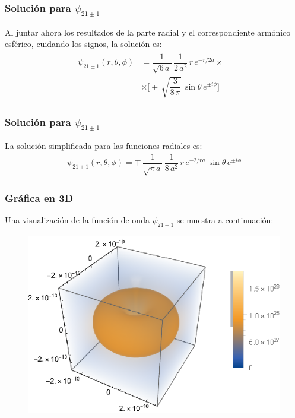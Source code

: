 \documentclass[12pt]{beamer}
\begin{document}
\begin{frame}
\frametitle{Solución para $\psi_{21 \pm 1}$}
Al juntar ahora los resultados de la parte radial y el correspondiente armónico esférico, cuidando los signos, la solución es:
\pause
\begin{eqnarray*}
\begin{aligned}
\psi_{21 \pm 1} (r, \theta, \phi) &= \dfrac{1}{\sqrt{6 \, a}} \, \dfrac{1}{2 \, a^{2}} \, r \, e^{-r/2a} \times \\[0.5em]
&\times \bigg[ \mp \, \sqrt{\dfrac{3}{8 \, \pi}} \, \sin \theta \, e^{\pm i \phi} \bigg]  =
\end{aligned}
\end{eqnarray*}
\end{frame}
\begin{frame}
\frametitle{Solución para $\psi_{21 \pm 1}$}
La solución simplificada para las funciones radiales es:
\pause
\begin{align*}
\psi_{21 \pm 1} (r, \theta, \phi) = \mp \, \dfrac{1}{\sqrt{\pi \, a}} \, \dfrac{1}{8 \, a^{2}} \, r \, e^{-2/ra} \, \sin \theta \, e^{\pm i \phi}
\end{align*}
\end{frame}
\begin{frame}
\frametitle{Gráfica en 3D}
Una visualización de la función de onda $\psi_{21 \pm 1}$ se muestra a continuación:
\pause
\begin{figure}
   \centering
   \includegraphics[scale=1]{Imagenes/Plot_Funcion_Onda_211.eps}
\end{figure}
\end{frame}
\end{document}
